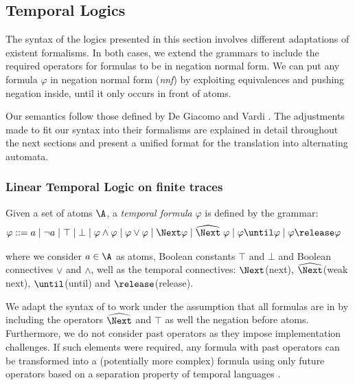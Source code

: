

\subsection{Temporal Logics }

The syntax of the logics presented in this section involves different adaptations of existent formalisms. In both cases, we extend the grammars to include the required operators for formulas to be in negation normal form. We can put any formula $\varphi$ in negation normal form (\textit{nnf}) by exploiting equivalences and pushing negation inside, until it only occurs in front of atoms. 

Our semantics follow those defined by De Giacomo and Vardi \cite{giavar15a}. The adjustments made to fit our syntax into their formalisms are explained in detail throughout the next sections and present a unified format for the translation into alternating automata.


\subsubsection{Linear Temporal Logic on finite traces \LTLf}


Given a set of atoms $\A$, a \emph{temporal formula} $\varphi$ is defined by the grammar: 
\begin{align*}
    \varphi ::= &\; a \mid \neg a \mid \top \mid \bot \mid
        \varphi \wedge \varphi \mid 
        \varphi \vee \varphi \mid \Next \varphi \mid \wnext \; \varphi \mid 
        \varphi \until \varphi \mid \varphi \release \varphi
\end{align*}

where we consider $a\in\A$ as atoms, Boolean constants $\top$ and $\bot$ and Boolean connectives $\vee$ and $\wedge$, well as the temporal connectives: $\Next$(next), $\wnext$(weak next), $\until$(until) and $\release$(release).

We adapt the syntax of \cite{cabsch19b} to work under the assumption that all formulas are in \nnf by
including the operators $\wnext$ and $\top$ as well the negation before atoms. 
Furthermore, we do not consider past operators as they impose implementation challenges. If such elements were required, any formula with past operators can be transformed into a (potentially more complex) formula using only future operators based on a separation property of temporal languages \cite{gabbay87a}.


